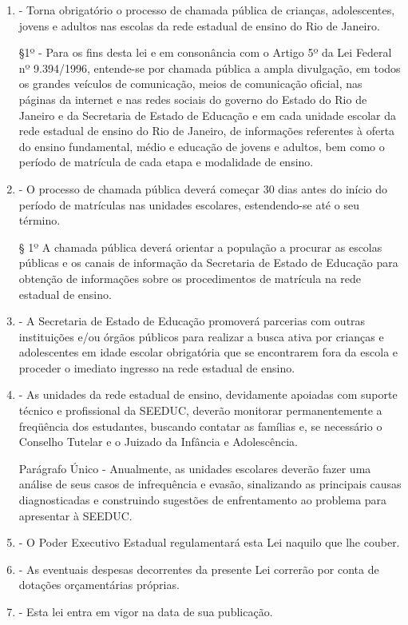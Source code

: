 \documentclass[10pt]{article}
\begin{document}
\begin{enumerate}[label=Art. \arabic*\textdegree]
\item - Torna obrigatório o processo de chamada pública de crianças, adolescentes, jovens e adultos nas escolas da rede estadual de ensino do Rio de Janeiro. 

§1º - Para os fins desta lei e em consonância com o Artigo 5º da Lei Federal nº 9.394/1996, entende-se por chamada pública a ampla divulgação, em todos os grandes veículos de comunicação, meios de comunicação oficial, nas páginas da internet e nas redes sociais do governo do Estado do Rio de Janeiro e da Secretaria de Estado de Educação e em cada unidade escolar da rede estadual de ensino do Rio de Janeiro, de informações referentes à oferta do ensino fundamental, médio e educação de jovens e adultos, bem como o período de matrícula de cada etapa e modalidade de ensino.

\item - O processo de chamada pública deverá começar 30 dias antes do início do período de matrículas nas unidades escolares, estendendo-se até o seu término. 

§ 1º A chamada pública deverá orientar a população a procurar as escolas públicas e os canais de informação da Secretaria de Estado de Educação para obtenção de informações sobre os procedimentos de matrícula na rede estadual de ensino.

\item - A Secretaria de Estado de Educação promoverá parcerias com outras instituições e/ou órgãos públicos para realizar a busca ativa por crianças e adolescentes em idade escolar obrigatória que se encontrarem fora da escola e proceder o imediato ingresso na rede estadual de ensino.

\item - As unidades da rede estadual de ensino, devidamente apoiadas com suporte técnico e profissional da SEEDUC, deverão monitorar permanentemente a freqüência  dos estudantes, buscando contatar as famílias e, se necessário o Conselho Tutelar e o Juizado da Infância e Adolescência.

Parágrafo Único - Anualmente, as unidades escolares deverão fazer uma análise de seus casos de infrequência e evasão, sinalizando as principais causas diagnosticadas e construindo sugestões de enfrentamento ao problema para apresentar à SEEDUC.

\item - O Poder Executivo Estadual regulamentará esta Lei naquilo que lhe couber.

\item - As eventuais despesas decorrentes da presente Lei correrão por conta de dotações orçamentárias próprias. 

\item - Esta lei entra em vigor na data de sua publicação.


\end{enumerate}
\end{document}
